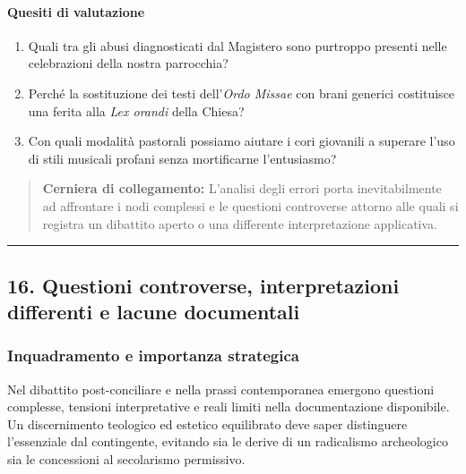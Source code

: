 \documentclass[12pt,a4paper]{article}
\begin{document}
	\paragraph{Quesiti di valutazione}\label{quesiti-di-valutazione}
	
	\begin{enumerate}[label=\arabic*.,leftmargin=*]
		\item Quali tra gli abusi diagnosticati dal Magistero sono purtroppo presenti nelle celebrazioni della nostra parrocchia?
		\item Perché la sostituzione dei testi dell'\emph{Ordo Missae} con brani generici costituisce una ferita alla \emph{Lex orandi} della Chiesa?
		\item Con quali modalità pastorali possiamo aiutare i cori giovanili a superare l'uso di stili musicali profani senza mortificarne l'entusiasmo?
	\end{enumerate}
	
	\begin{quote}
		\textbf{Cerniera di collegamento:} L'analisi degli errori porta inevitabilmente ad affrontare i nodi complessi e le questioni controverse attorno alle quali si registra un dibattito aperto o una differente interpretazione applicativa.
	\end{quote}
	
	\begin{center}\rule{0.5\linewidth}{0.5pt}\end{center}
	
	\subsection{16. Questioni controverse, interpretazioni differenti e lacune documentali}\label{questioni-controverse-interpretazioni-differenti-e-lacune-documentali}
	
	\subsubsection{Inquadramento e importanza strategica}\label{inquadramento-e-importanza-strategica-14}
	
	Nel dibattito post-conciliare e nella prassi contemporanea emergono questioni complesse, tensioni interpretative e reali limiti nella documentazione disponibile. Un discernimento teologico ed estetico equilibrato deve saper distinguere l'essenziale dal contingente, evitando sia le derive di un radicalismo archeologico sia le concessioni al secolarismo permissivo.
	
\end{document}
